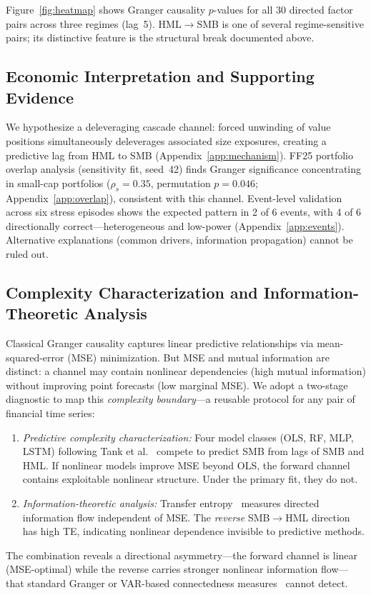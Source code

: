 \documentclass[sigconf,anonymous]{acmart}
\begin{document}
Figure~\ref{fig:heatmap} shows Granger causality $p$-values for all 30
directed factor pairs across three regimes (lag~5). HML$\to$SMB is one of
several regime-sensitive pairs; its distinctive feature is the structural
break documented above.

\subsection{Economic Interpretation and Supporting Evidence}
\label{sec:interpretation}\label{sec:overlap_evidence}
We hypothesize a deleveraging cascade channel: forced unwinding of value positions
simultaneously deleverages associated size exposures, creating a predictive lag from
HML to SMB (Appendix~\ref{app:mechanism}). FF25 portfolio overlap analysis (sensitivity
fit, seed~42) finds Granger significance concentrating in small-cap portfolios
($\rho_s = 0.35$, permutation $p = 0.046$; Appendix~\ref{app:overlap}), consistent
with this channel. Event-level validation across six stress episodes shows the expected
pattern in 2 of 6 events, with 4 of 6 directionally correct---heterogeneous and low-power
(Appendix~\ref{app:events}).
Alternative explanations (common drivers, information propagation) cannot be ruled out.

\subsection{Complexity Characterization and Information-Theoretic Analysis}
\label{sec:ml_validation}

Classical Granger causality captures linear predictive relationships via
mean-squared-error (MSE) minimization. But MSE and mutual information are
distinct: a channel may contain nonlinear dependencies (high mutual
information) without improving point forecasts (low marginal MSE).
We adopt a two-stage diagnostic to map this \emph{complexity boundary}---a
reusable protocol for any pair of financial time series:
\begin{enumerate}
    \item \emph{Predictive complexity characterization:} Four model classes
    (OLS, RF, MLP, LSTM) following Tank et al.~\cite{tank2022neural} compete
    to predict SMB from lags of SMB and HML. If nonlinear models improve MSE
    beyond OLS, the forward channel contains exploitable nonlinear structure.
    Under the primary fit, they do not.
    \item \emph{Information-theoretic analysis:} Transfer
    entropy~\cite{schreiber2000measuring} measures directed information flow
    independent of MSE. The \emph{reverse} SMB$\to$HML direction has high TE,
    indicating nonlinear dependence invisible to predictive methods.
\end{enumerate}
The combination reveals a directional asymmetry---the forward channel is
linear (MSE-optimal) while the reverse carries stronger nonlinear information
flow---that standard Granger or VAR-based connectedness
measures~\cite{diebold2012better} cannot detect.
\end{document}
